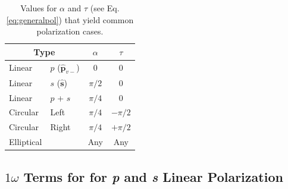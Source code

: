 \documentclass[aps,pra,10pt,amsmath,notitlepage,letterpaper]{revtex4-1}
\begin{document}
\begin{table}
\caption{Values for $\alpha$ and $\tau$ (see Eq. \eqref{eq:generalpol}) that
yield common polarization cases.\label{tab:polcases}}
\begin{tabular}{ | l l | c c | }
\hline
\multicolumn{2}{|c|}{Type}                    & $\alpha$  & $\tau$    \\
\hline
Linear        & $p$ ($\hat{\mathbf{p}}_{v-}$) & 0         & 0         \\
Linear        & $s$ ($\hat{\mathbf{s}}$)      & $\pi/2$   & 0         \\
Linear        & $p$ + $s$ & $\pi/4$           & 0         \\
\hline
Circular      & Left                          & $\pi/4$   & $-\pi/2$  \\
Circular      & Right                         & $\pi/4$   & $+\pi/2$  \\
\hline
Elliptical    &                               & Any       & Any       \\
\hline
\end{tabular}
\end{table}



\subsection{\texorpdfstring{$1\omega$}{1w} Terms for for \emph{p} and \emph{s}
Linear Polarization}
\end{document}

